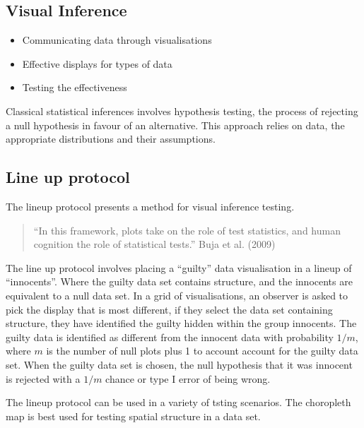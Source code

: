\documentclass[conference,final,]{IEEEtran}
\providecommand{\tightlist}{%
  \setlength{\itemsep}{0pt}\setlength{\parskip}{0pt}}
\begin{document}
\hypertarget{visual-inference}{%
\subsection{Visual Inference}\label{visual-inference}}

\begin{itemize}
\tightlist
\item
  Communicating data through visualisations
\item
  Effective displays for types of data
\item
  Testing the effectiveness
\end{itemize}

Classical statistical inferences involves hypothesis testing, the
process of rejecting a null hypothesis in favour of an alternative. This
approach relies on data, the appropriate distributions and their
assumptions.

\hypertarget{line-up-protocol}{%
\subsection{Line up protocol}\label{line-up-protocol}}

The lineup protocol presents a method for visual inference testing.

\begin{quote}
``In this framework, plots take on the role of test statistics, and
human cognition the role of statistical tests.'' Buja et al. (2009)
\end{quote}

The line up protocol involves placing a ``guilty'' data visualisation in
a lineup of ``innocents''. Where the guilty data set contains structure,
and the innocents are equivalent to a null data set. In a grid of
visualisations, an observer is asked to pick the display that is most
different, if they select the data set containing structure, they have
identified the guilty hidden within the group innocents. The guilty data
is identified as different from the innocent data with probability
\(1/m\), where \(m\) is the number of null plots plus 1 to account
account for the guilty data set. When the guilty data set is chosen, the
null hypothesis that it was innocent is rejected with a \(1/m\) chance
or type I error of being wrong.

The lineup protocol can be used in a variety of tsting scenarios. The
choropleth map is best used for testing spatial structure in a data set.
\end{document}
